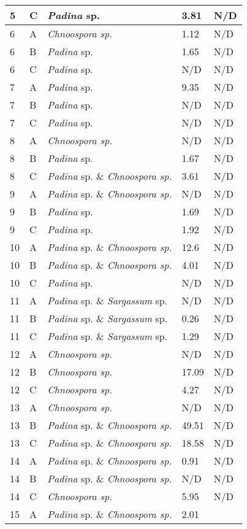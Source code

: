 \documentclass[12pt]{article}
\begin{document}
\begin{longtable}{ | p{1cm} | p{1cm} | p{3cm} | p{4cm} | p{4cm} | }
\hline
5&C&\emph{Padina} sp.&3.81
&N/D\\
\hline
6&A&\emph{Chnoospora sp.}&1.12
&N/D\\
\hline
6&B&\emph{Padina} sp.&1.65
&N/D\\
\hline
6&C&\emph{Padina} sp.&N/D&N/D\\
\hline
7&A&\emph{Padina} sp.&9.35
&N/D\\
\hline
7&B&\emph{Padina} sp.&N/D&N/D\\
\hline
7&C&\emph{Padina} sp.&N/D&N/D\\
\hline
8&A&\emph{Chnoospora sp.}&N/D&N/D\\
\hline
8&B&\emph{Padina} sp.&1.67
&N/D\\
\hline
8&C&\emph{Padina} sp. \& \emph{Chnoospora sp.}&3.61
&N/D\\
\hline
9&A&\emph{Padina} sp. \& \emph{Chnoospora sp.}&N/D&N/D\\
\hline
9&B&\emph{Padina} sp.&1.69
&N/D\\
\hline
9&C&\emph{Padina} sp.&1.92
&N/D\\
\hline
10&A&\emph{Padina} sp. \& \emph{Chnoospora sp.}&12.6
&N/D\\
\hline
10&B&\emph{Padina} sp. \& \emph{Chnoospora sp.}&4.01
&N/D\\
\hline
10&C&\emph{Padina} sp.&N/D&N/D\\
\hline
11&A&\emph{Padina} sp. \& \emph{Sargassum} sp.&N/D&N/D\\
\hline
11&B&\emph{Padina} sp. \& \emph{Sargassum} sp.&0.26
&N/D\\
\hline
11&C&\emph{Padina} sp. \& \emph{Sargassum} sp.&1.29
&N/D\\
\hline
12&A&\emph{Chnoospora sp.}&N/D&N/D\\
\hline
12&B&\emph{Chnoospora sp.}&17.09
&N/D\\
\hline
12&C&\emph{Chnoospora sp.}&4.27
&N/D\\
\hline
13&A&\emph{Chnoospora sp.}&N/D&N/D\\
\hline
13&B&\emph{Padina} sp. \& \emph{Chnoospora sp.}&49.51
&N/D\\
\hline
13&C&\emph{Padina} sp. \& \emph{Chnoospora sp.}&18.58
&N/D\\
\hline
14&A&\emph{Padina} sp. \& \emph{Chnoospora sp.}&0.91
&N/D\\
\hline
14&B&\emph{Padina} sp. \& \emph{Chnoospora sp.}&N/D&N/D\\
\hline
14&C&\emph{Chnoospora sp.}&5.95
&N/D\\
\hline
15&A&\emph{Padina} sp. \& \emph{Chnoospora sp.}&2.01

\end{longtable}
\end{document}
